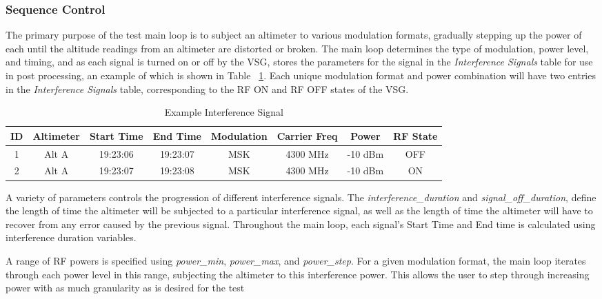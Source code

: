 \subsubsection{Sequence Control}\label{subsub:sequence}
The primary purpose of the test main loop is to subject an altimeter to various modulation formats, gradually stepping up the power of each until the altitude readings from an altimeter are distorted or broken. The main loop determines the type of modulation, power level, and timing, and as each signal is turned on or off by the VSG, stores the parameters for the signal in the \textit{Interference Signals} table for use in post processing, an example of which is shown in Table ~\ref{tab:Interference}. Each unique modulation format and power combination will have two entries in the \textit{Interference Signals} table, corresponding to the RF ON and RF OFF states of the VSG.  
\begin{table}[]
\centering
\begin{tabular}{@{}cccccccc@{}}
\toprule
ID & Altimeter   & Start Time          & End Time            & Modulation &Carrier Freq& Power & RF State \\ \midrule
1  & Alt A & 19:23:06 & 19:23:07 & MSK & 4300  MHz & -10  dBm & OFF      \\
2  & Alt A & 19:23:07 & 19:23:08 & MSK & 4300   MHz & -10 dBm& ON       \\ \bottomrule
\end{tabular}
\caption{Example Interference Signal}
\label{tab:Interference}
\end{table}

A variety of parameters controls the progression of different interference signals. The \textit{interference\_duration} and \textit{signal\_off\_duration}, define the length of time the altimeter will be subjected to a particular interference signal, as well as the length of time the altimeter will have to recover from any error caused by the previous signal. Throughout the main loop, each signal's Start Time and End time is calculated using interference duration variables. 

 A range of RF powers is specified using \textit{power\_min}, \textit{power\_max}, and \textit{power\_step}. For a given modulation format, the main loop iterates through each power level in this range, subjecting the altimeter to this interference power. This allows the user to step through increasing power with as much granularity as is desired for the test


